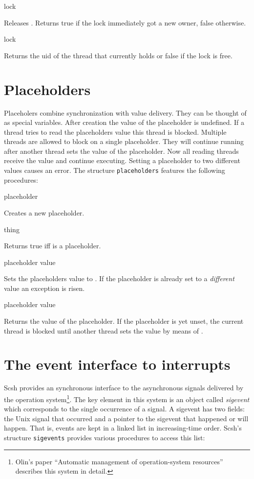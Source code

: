  {lock} {\boolean}

Releases . Returns true if the lock immediately got a new
owner, false otherwise.

 {lock} {\integer}

Returns the uid of the thread that currently holds  or false
if the lock is free.

\section{Placeholders}
Placeholers combine synchronization with value delivery. They can be
thought of as special variables. After creation the value of the
placeholder is undefined. If a thread tries to read the placeholders
value this thread is blocked. Multiple threads are allowed to block on
a single placeholder. They will continue running after another thread
sets the value of the placeholder. Now all reading threads receive the
value and continue executing. Setting a placeholder to two different
values causes an error. The structure \texttt{placeholders} features
the following procedures:

 {} {placeholder}

Creates a new placeholder.

 {thing} {\boolean}

Returns true iff  is a placeholder.

 {placeholder value} {\undefined}

Sets the placeholders value to . If the placeholder is
already set to a \textit{different} value an exception is risen.

 {placeholder} {value}

Returns the value of the placeholder. If the placeholder is yet unset,
the current thread is blocked until another thread sets the value by
means of .

\section{The event interface to interrupts}
\label{sec:event-interf-interr}
Scsh provides an synchronous interface to the asynchronous signals
delivered by the operation system\footnote{Olin's paper ``Automatic
  management of operation-system resources'' describes this system in
  detail.}.  The key element in this system is an object called
\textit{sigevent} which corresponds to the single occurrence of a
signal. A sigevent has two fields: the Unix signal that occurred and a
pointer to the sigevent that happened or will happen. That is, events
are kept in a linked list in increasing-time order. Scsh's structure
\texttt{sigevents} provides various procedures to access this list:

